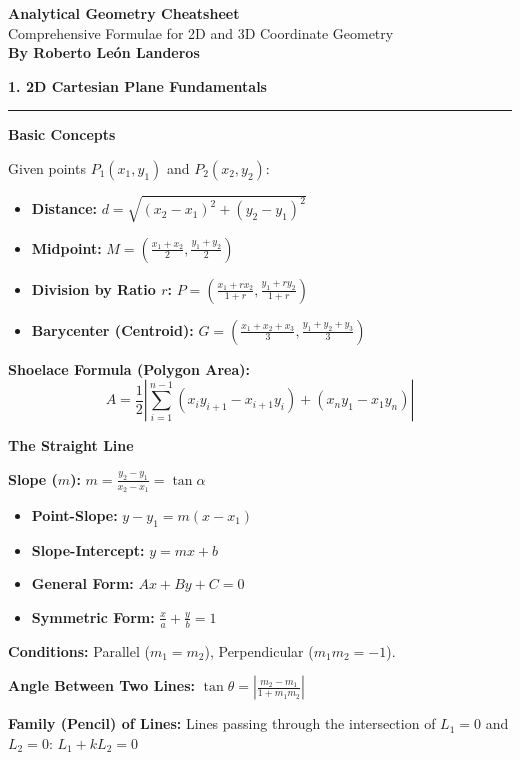 \documentclass[10pt, landscape, twocolumn]{article}
\newcommand{\cheatsheetsection}[1]{
    \vspace{0.6em}
    {\color{themeblue}\large\bfseries #1} \par
    \vspace{-0.5em}
    {\color{themeblue}\rule{\linewidth}{1pt}} \par
    \vspace{0.2em}
}
\newcommand{\cheatsheetsubsection}[1]{
    \vspace{0.4em}
    {\color{themeblue}\normalsize\bfseries #1} \par
    \vspace{0.1em}
}
\begin{document}
\begin{center}
    \vspace{-1em}
    {\color{themeblue}\huge\bfseries Analytical Geometry Cheatsheet}\\[0.1em]
    {\color{themegray}\small Comprehensive Formulae for 2D and 3D Coordinate Geometry}\\[0.4em]
    {\color{themegray}\footnotesize \textbf{By Roberto León Landeros}}
\end{center}
\vspace{-1em}

\cheatsheetsection{1. 2D Cartesian Plane Fundamentals}

\cheatsheetsubsection{Basic Concepts}
Given points $P_1(x_1, y_1)$ and $P_2(x_2, y_2)$:
\begin{itemize}[leftmargin=*, nosep]
    \item \textbf{Distance:} $d = \sqrt{(x_2 - x_1)^2 + (y_2 - y_1)^2}$
    \item \textbf{Midpoint:} $M = \left( \frac{x_1 + x_2}{2}, \frac{y_1 + y_2}{2} \right)$
    \item \textbf{Division by Ratio $r$:} $P = \left( \frac{x_1 + rx_2}{1 + r}, \frac{y_1 + ry_2}{1 + r} \right)$
    \item \textbf{Barycenter (Centroid):} $G = \left( \frac{x_1+x_2+x_3}{3}, \frac{y_1+y_2+y_3}{3} \right)$
\end{itemize}

\textbf{Shoelace Formula (Polygon Area):}
\[ A = \frac{1}{2} \left| \sum_{i=1}^{n-1} (x_i y_{i+1} - x_{i+1} y_i) + (x_n y_1 - x_1 y_n) \right| \]

\cheatsheetsubsection{The Straight Line}
\textbf{Slope ($m$):} $m = \frac{y_2 - y_1}{x_2 - x_1} = \tan \alpha$
\begin{itemize}[leftmargin=*, nosep]
    \item \textbf{Point-Slope:} $y - y_1 = m(x - x_1)$
    \item \textbf{Slope-Intercept:} $y = mx + b$
    \item \textbf{General Form:} $Ax + By + C = 0$
    \item \textbf{Symmetric Form:} $\frac{x}{a} + \frac{y}{b} = 1$
\end{itemize}
\textbf{Conditions:} Parallel ($m_1 = m_2$), Perpendicular ($m_1 m_2 = -1$).

\textbf{Angle Between Two Lines:} $\tan \theta = \left| \frac{m_2 - m_1}{1 + m_1 m_2} \right|$

\textbf{Family (Pencil) of Lines:} Lines passing through the intersection of $L_1=0$ and $L_2=0$: $L_1 + kL_2 = 0$
\end{document}
